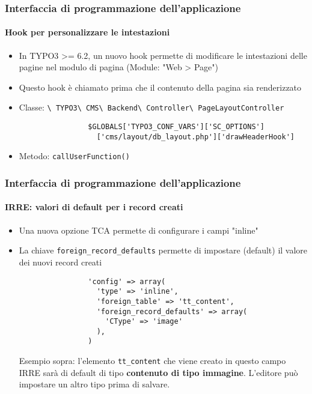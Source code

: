 \begin{frame}[fragile]
	\frametitle{Interfaccia di programmazione dell'applicazione}
	\framesubtitle{Hook per personalizzare le intestazioni}

	\begin{itemize}
		\item In TYPO3 >= 6.2, un nuovo hook permette di modificare le intestazioni delle pagine nel modulo di pagina (Module: "Web > Page")
		\item Questo hook è chiamato prima che il contenuto della pagina sia renderizzato
		\item Classe:\newline
			\smaller
				\texttt{\textbackslash
					TYPO3\textbackslash
					CMS\textbackslash
					Backend\textbackslash
					Controller\textbackslash
					PageLayoutController}\normalsize

			\lstset{
				basicstyle=\smaller\ttfamily
			}

			\begin{lstlisting}
				$GLOBALS['TYPO3_CONF_VARS']['SC_OPTIONS']
				  ['cms/layout/db_layout.php']['drawHeaderHook']
			\end{lstlisting}

		\item Metodo:\newline
			\smaller
				\texttt{callUserFunction()}

	\end{itemize}

\end{frame}


\begin{frame}[fragile]
	\frametitle{Interfaccia di programmazione dell'applicazione}
	\framesubtitle{IRRE: valori di default per i record creati}

	\begin{itemize}
		\item Una nuova opzione TCA permette di configurare i campi "inline"
		\item La chiave \texttt{foreign\_record\_defaults} permette di impostare (default) il valore dei nuovi record creati

			\begin{lstlisting}
				'config' => array(
				  'type' => 'inline',
				  'foreign_table' => 'tt_content',
				  'foreign_record_defaults' => array(
				    'CType' => 'image'
				  ),
				)
			\end{lstlisting}

			\small
				Esempio sopra: l'elemento \texttt{tt\_content} che viene creato in questo campo IRRE sarà di default di tipo \textbf{contenuto di tipo immagine}. L'editore può impostare un altro tipo prima di salvare.
			\normalsize

	\end{itemize}

\end{frame}

